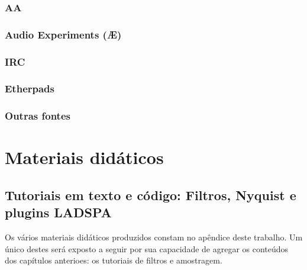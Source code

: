 \subsubsection{AA}

\subsubsection{Audio Experiments (Æ)}

\subsubsection{IRC}

\subsubsection{Etherpads}

\subsubsection{Outras fontes}

\section{Materiais didáticos}

  \subsection{Tutoriais em texto e código: Filtros, Nyquist e plugins LADSPA}

Os vários materiais didáticos produzidos constam no apêndice
deste trabalho. Um único destes será exposto a seguir por sua
capacidade de agregar os conteúdos dos capítulos anterioes:
os tutoriais de filtros e amostragem.

